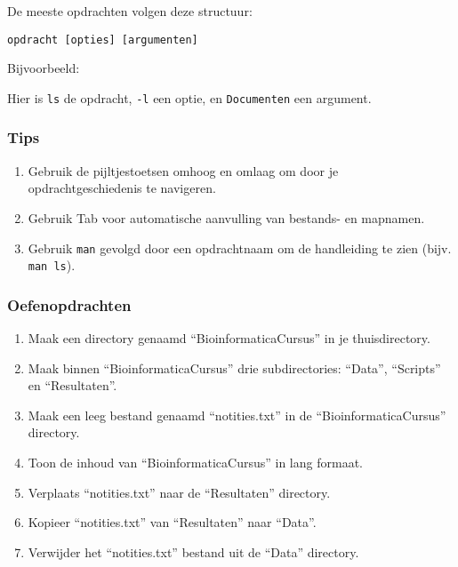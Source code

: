 \documentclass[
  letterpaper,
  DIV=11,
  numbers=noendperiod]{scrartcl}
\newenvironment{Shaded}{\begin{snugshade}}{\end{snugshade}}
\newcommand{\AttributeTok}[1]{\textcolor[rgb]{0.40,0.45,0.13}{#1}}
\newcommand{\ExtensionTok}[1]{\textcolor[rgb]{0.00,0.23,0.31}{#1}}
\newcommand{\NormalTok}[1]{\textcolor[rgb]{0.00,0.23,0.31}{#1}}
\providecommand{\tightlist}{%
  \setlength{\itemsep}{0pt}\setlength{\parskip}{0pt}}\usepackage{longtable,booktabs,array}
\begin{document}
De meeste opdrachten volgen deze structuur:

\begin{verbatim}
opdracht [opties] [argumenten]
\end{verbatim}

Bijvoorbeeld:

\begin{Shaded}
\end{Shaded}

Hier is \texttt{ls} de opdracht, \texttt{-l} een optie, en
\texttt{Documenten} een argument.

\subsubsection{Tips}\label{tips}

\begin{enumerate}
\def\labelenumi{\arabic{enumi}.}
\tightlist
\item
  Gebruik de pijltjestoetsen omhoog en omlaag om door je
  opdrachtgeschiedenis te navigeren.
\item
  Gebruik Tab voor automatische aanvulling van bestands- en mapnamen.
\item
  Gebruik \texttt{man} gevolgd door een opdrachtnaam om de handleiding
  te zien (bijv. \texttt{man\ ls}).
\end{enumerate}

\subsubsection{Oefenopdrachten}\label{oefenopdrachten}

\begin{enumerate}
\def\labelenumi{\arabic{enumi}.}
\tightlist
\item
  Maak een directory genaamd ``BioinformaticaCursus'' in je
  thuisdirectory.
\item
  Maak binnen ``BioinformaticaCursus'' drie subdirectories: ``Data'',
  ``Scripts'' en ``Resultaten''.
\item
  Maak een leeg bestand genaamd ``notities.txt'' in de
  ``BioinformaticaCursus'' directory.
\item
  Toon de inhoud van ``BioinformaticaCursus'' in lang formaat.
\item
  Verplaats ``notities.txt'' naar de ``Resultaten'' directory.
\item
  Kopieer ``notities.txt'' van ``Resultaten'' naar ``Data''.
\item
  Verwijder het ``notities.txt'' bestand uit de ``Data'' directory.
\end{enumerate}
\end{document}
